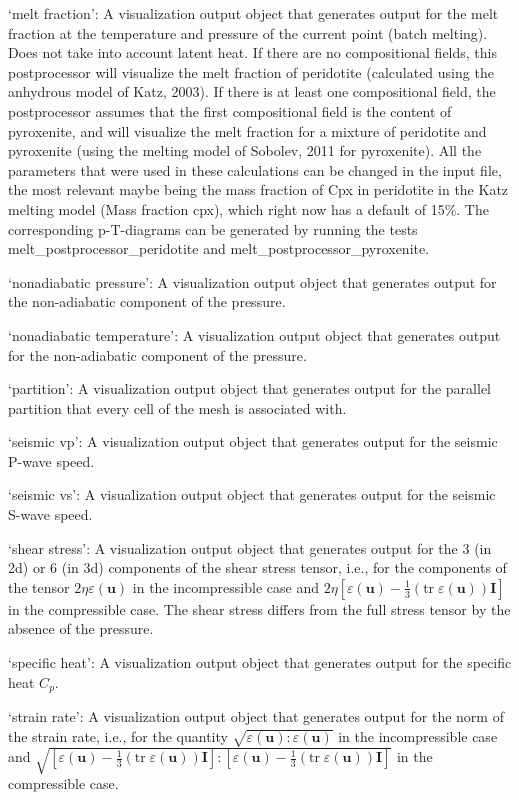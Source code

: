 \begin{itemize}
`melt fraction': A visualization output object that generates output for the melt fraction at the temperature and pressure of the current point (batch melting). Does not take into account latent heat. If there are no compositional fields, this postprocessor will visualize the melt fraction of peridotite (calculated using the anhydrous model of Katz, 2003). If there is at least one compositional field, the postprocessor assumes that the  first compositional field is the content of pyroxenite, and will visualize the melt fraction for a mixture of peridotite and pyroxenite (using the melting model of Sobolev, 2011 for pyroxenite). All the parameters that were used in these calculations can be changed in the input file, the most relevant maybe being the mass fraction of Cpx in peridotite in the Katz melting model (Mass fraction cpx), which right now has a default of 15\%. The corresponding p-T-diagrams can be generated by running the tests melt\_postprocessor\_peridotite and melt\_postprocessor\_pyroxenite.

`nonadiabatic pressure': A visualization output object that generates output for the non-adiabatic component of the pressure.

`nonadiabatic temperature': A visualization output object that generates output for the non-adiabatic component of the pressure.

`partition': A visualization output object that generates output for the parallel partition that every cell of the mesh is associated with.

`seismic vp': A visualization output object that generates output for the seismic P-wave speed.

`seismic vs': A visualization output object that generates output for the seismic S-wave speed.

`shear stress': A visualization output object that generates output for the 3 (in 2d) or 6 (in 3d) components of the shear stress tensor, i.e., for the components of the tensor $2\eta\varepsilon(\mathbf u)$ in the incompressible case and $2\eta\left[\varepsilon(\mathbf u)-\tfrac 13(\textrm{tr}\;\varepsilon(\mathbf u))\mathbf I\right]$ in the compressible case. The shear stress differs from the full stress tensor by the absence of the pressure.

`specific heat': A visualization output object that generates output for the specific heat $C_p$.

`strain rate': A visualization output object that generates output for the norm of the strain rate, i.e., for the quantity $\sqrt{\varepsilon(\mathbf u):\varepsilon(\mathbf u)}$ in the incompressible case and $\sqrt{[\varepsilon(\mathbf u)-\tfrac 13(\textrm{tr}\;\varepsilon(\mathbf u))\mathbf I]:[\varepsilon(\mathbf u)-\tfrac 13(\textrm{tr}\;\varepsilon(\mathbf u))\mathbf I]}$ in the compressible case.


\end{itemize}
